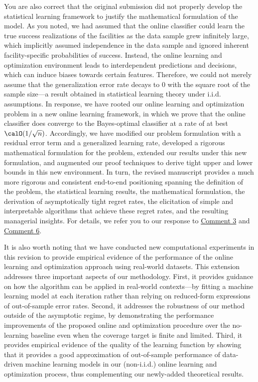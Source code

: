 \documentclass[11pt]{article}
\begin{document}
You are also correct that the original submission did not properly develop the statistical learning framework to justify the mathematical formulation of the model. As you noted, we had assumed that the online classifier could learn the true success realizations of the facilities as the data sample grew infinitely large, which implicitly assumed independence in the data sample and ignored inherent facility-specific probabilities of success. Instead, the online learning and optimization environment leads to interdependent predictions and decisions, which can induce biases towards certain features. Therefore, we could not merely assume that the generalization error rate decays to 0 with the square root of the sample size---a result obtained in statistical learning theory under i.i.d. assumptions. In response, we have rooted our online learning and optimization problem in a new online learning framework, in which we prove that the online classifier does converge to the Bayes-optimal classifier at a rate of at best $\calO(1/\sqrt{n})$. Accordingly, we have modified our problem formulation with a residual error term and a generalized learning rate, developed a rigorous mathematical formulation for the problem, extended our results under this new formulation, and augmented our proof techniques to derive tight upper and lower bounds in this new environment. In turn, the revised manuscript provides a much more rigorous and consistent end-to-end positioning spanning the definition of the problem, the statistical learning results, the mathematical formulation, the derivation of asymptotically tight regret rates, the elicitation of simple and interpretable algorithms that achieve these regret rates, and the resulting managerial insights. For details, we refer you to our response to \hyperref[R2:3]{\color{blue}Comment 3} and \hyperref[R2:6]{\color{blue}Comment 6}.

It is also worth noting that we have conducted new computational experiments in this revision to provide empirical evidence of the performance of the online learning and optimization approach using real-world datasets. This extension addresses three important aspects of our methodology. First, it provides guidance on how the algorithm can be applied in real-world contexts---by fitting a machine learning model at each iteration rather than relying on reduced-form expressions of out-of-sample error rates. Second, it addresses the robustness of our method outside of the asymptotic regime, by demonstrating the performance improvements of the proposed online and optimization procedure over the no-learning baseline even when the coverage target is finite and limited. Third, it provides empirical evidence of the quality of the learning function by showing that it provides a good approximation of out-of-sample performance of data-driven machine learning models in our (non-i.i.d.) online learning and optimization process, thus complementing our newly-added theoretical results.
\end{document}
